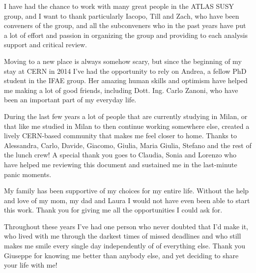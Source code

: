 \par\bigskip
I have had the chance to work with many great people in the ATLAS SUSY group, and 
I want to thank particularly Iacopo, Till and Zach, who have been conveners of the group,
and all the subconveners who in the past years 
have put a lot of effort and passion in organizing the group and providing to each 
analysis support and critical review. 

\par\bigskip 
Moving to a new place is always somehow scary, but since the beginning of my 
stay at CERN in 2014 I've had the opportunity to rely on Andrea, a fellow PhD student in the 
IFAE group. 
Her amazing human skills and optimism have helped me making a lot of good friends, including Dott. Ing. 
Carlo Zanoni, who have been an important part of my everyday life. 

\par\bigskip

During the last few years a lot of people that are currently studying in Milan, or that like me 
studied in Milan to then continue working somewhere else, created a lively CERN-based community that 
makes me feel closer to home. 
Thanks to Alessandra, Carlo, Davide, Giacomo, Giulia, Maria Giulia, Stefano and the rest of the 
lunch crew! A special thank you goes to Claudia, Sonia and Lorenzo who have helped me reviewing this document and 
sustained me in the last-minute panic moments. 

\par\bigskip 
My family has been supportive of my choices for my entire life. 
Without the help and love of my mom, my dad and Laura I would not have even been able to start this work. 
Thank you for giving me all the opportunities I could ask for. 

\par\bigskip 
Throughout these years I've had one person who never doubted that I'd make it, 
who lived with me through the darkest times of missed deadlines 
and who still makes me smile every single day independently 
of of everything else. 
Thank you Giuseppe for knowing me better than anybody else, 
and yet deciding to share your life with me! 


